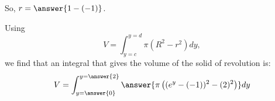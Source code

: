 \documentclass{ximera}
\begin{document}
\begin{exercise}
\begin{exercise}
\begin{exercise}
\begin{exercise}
 \begin{multipleChoice}
\end{multipleChoice} 

So, $r= \answer{1-(-1)}$.

\end{exercise}            
            
\begin{exercise}

Using \[V = \int_{y=c}^{y=d} \pi\left(R^2-r^2\right) dy, \] we find that an integral that gives the volume of the solid of revolution is:            
	\[
	V= \int_{y=\answer{0}}^{y=\answer{2}}
	\answer{\pi \left((e^y-(-1))^2-(2)^2\right)} dy
	\]
\end{exercise}
\end{exercise}
\end{exercise}
\end{exercise}
\end{document}
